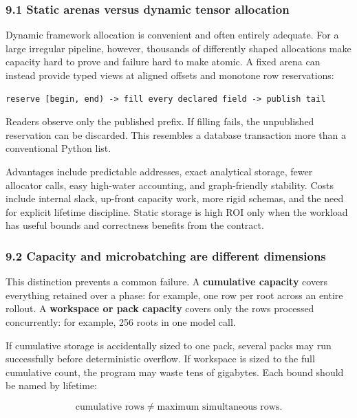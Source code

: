 \documentclass[
  10pt,
  letterpaper,
]{article}
\begin{document}
\subsubsection{9.1 Static arenas versus dynamic tensor
allocation}\label{91-static-arenas-versus-dynamic-tensor-allocation}

Dynamic framework allocation is convenient and often entirely adequate.
For a large irregular pipeline, however, thousands of differently shaped
allocations make capacity hard to prove and failure hard to make atomic.
A fixed arena can instead provide typed views at aligned offsets and
monotone row reservations:

\begin{verbatim}
reserve [begin, end) -> fill every declared field -> publish tail
\end{verbatim}

Readers observe only the published prefix. If filling fails, the
unpublished reservation can be discarded. This resembles a database
transaction more than a conventional Python list.

Advantages include predictable addresses, exact analytical storage,
fewer allocator calls, easy high-water accounting, and graph-friendly
stability. Costs include internal slack, up-front capacity work, more
rigid schemas, and the need for explicit lifetime discipline. Static
storage is high ROI only when the workload has useful bounds and
correctness benefits from the contract.

\subsubsection{9.2 Capacity and microbatching are different
dimensions}\label{92-capacity-and-microbatching-are-different-dimensions}

This distinction prevents a common failure. A \textbf{cumulative
capacity} covers everything retained over a phase: for example, one row
per root across an entire rollout. A \textbf{workspace or pack capacity}
covers only the rows processed concurrently: for example, 256 roots in
one model call.

If cumulative storage is accidentally sized to one pack, several packs
may run successfully before deterministic overflow. If workspace is
sized to the full cumulative count, the program may waste tens of
gigabytes. Each bound should be named by lifetime:

\[
\text{cumulative rows} \ne \text{maximum simultaneous rows}.
\]
\end{document}

